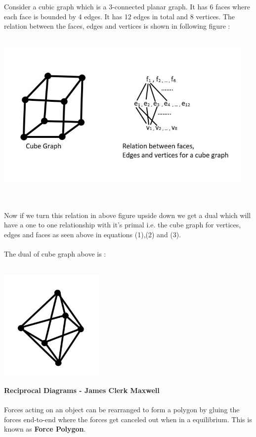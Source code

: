 \documentclass{article}
\begin{document}
    \\\\
    Consider a cubic graph which is a 3-connected planar graph. It has 6 faces where each face is bounded by 4 edges. It has 12 edges in total and 8 vertices. The relation between the faces, edges and vertices is shown in following figure : 
    \\\\
    \centerline{\includegraphics[width=5in]{Images/cube_graph.JPG}}
    \\\\
    Now if we turn this relation in above figure upside down we get a dual which will have a one to one relationship with it's primal i.e. the cube graph for vertices, edges and faces as seen above in equations (1),(2) and (3).
    \\\\
    The dual of cube graph above is : 
    \\\\
    \centerline{\includegraphics[width=2in]{Images/octahedron.JPG}}
    \newpage
    \textbf{Reciprocal Diagrams - James Clerk Maxwell}
    \\\\
    Forces acting on an object can be rearranged to form a polygon by gluing the forces end-to-end where the forces get canceled out when in a equilibrium. This is known as \textbf{Force Polygon}.
\end{document}
